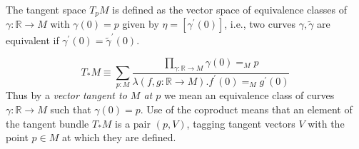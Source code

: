 \documentclass{letter}
\begin{document}
The tangent space $T_p M$ is defined as the vector space of equivalence classes
of $\gamma : \mathbb{R} \to M$ with $\gamma(0) = p$
given by $\eta = [\gamma^\prime(0)]$, i.e., two curves
$\gamma, \tilde{\gamma}$ are equivalent if
$\gamma^\prime(0) = \tilde{\gamma}^\prime(0)$.

$$
T_{*}M \equiv
  \sum_{p : M}
    \frac{\prod_{\gamma : \mathbb{R} \to M} \gamma(0) =_M p}
         {\lambda (f, g : \mathbb{R} \to M) .  f^\prime(0) =_M g^\prime(0)}
$$
Thus by a \emph{vector tangent to $M$ at $p$} we mean an equivalence class
of curves $\gamma : \mathbb{R} \to M$ such that $\gamma(0) = p$.
Use of the coproduct means that an element of the tangent bundle $T_{*}M$
is a pair $(p, V)$, tagging tangent vectors $V$ with the point $p \in M$
at which they are defined.
\end{document}
